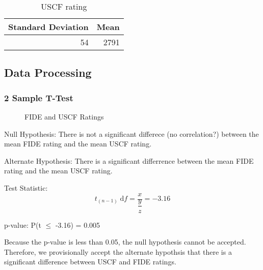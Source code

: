 \documentclass[12pt]{article}
\begin{document}
\begin{table}[H]
\begin{center}
\begin{tabular}{rr}
Standard Deviation & Mean\\
\hline
54 & 2791\\
\end{tabular}
    \caption{USCF rating}
\end{center}
\end{table}


\subsection{Data Processing}
\subsubsection{2 Sample T-Test}
\begin{figure}[H]
\centering
{}
\caption{FIDE and USCF Ratings}
\end{figure}

Null Hypothesis: There is not a significant differece (no correlation?) between the mean FIDE rating and the mean USCF rating.

Alternate Hypothesis: There is a significant differrence between the mean FIDE rating and the mean USCF rating. 

Test Statistic: 
\begin{equation}
    t_{(n-1)} \; \textrm{d}f = \dfrac{x}{\dfrac{y}{z}} = -3.16
\end{equation}

p-value: P(t \(\leq\) -3.16) = 0.005

Because the p-value is less than 0.05, the null hypothesis cannot be accepted. Therefore, we provisionally accept the alternate hypothsis that there is a significant difference between USCF and FIDE ratings.
\end{document}
